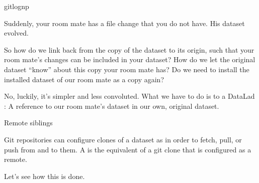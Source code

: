 \begin{sphinxVerbatim}[commandchars=\\\{\}]
gitlog\PYGZhy{}n\PYGZhy{}p


\end{sphinxVerbatim}

\sphinxAtStartPar
Suddenly, your room mate has a file change that you do not have.
His dataset evolved.

\sphinxAtStartPar
So how do we link back from the copy of the dataset to its
origin, such that your room mate’s changes can be included in
your dataset? How do we let the original dataset “know” about
this copy your room mate has?
Do we need to install the installed dataset of our room mate
as a copy again?

\sphinxAtStartPar
No, luckily, it’s simpler and less convoluted. What we have to
do is to  a DataLad {\hyperref[\detokenize{glossary:term-sibling}]{}}: A reference to our room mate’s
dataset in our own, original dataset.

\ignorespaces \begin{gitusernote}[label={index-2}, before title={\thetcbcounter\ }, check odd page=true]{Remote siblings}
\label{\detokenize{basics/101-121-siblings:index-2}}

\sphinxAtStartPar
Git repositories can configure clones of a dataset as  in
order to fetch, pull, or push from and to them. A 
is the equivalent of a git clone that is configured as a remote.


\end{gitusernote}

\sphinxAtStartPar
Let’s see how this is done.

